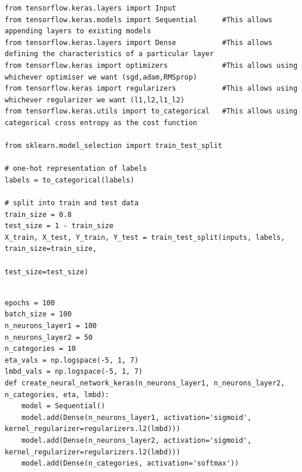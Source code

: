 \documentclass{beamer}
\begin{document}
\begin{frame}
\begin{verbatim}
\end{verbatim}




















\begin{verbatim}
from tensorflow.keras.layers import Input
from tensorflow.keras.models import Sequential      #This allows appending layers to existing models
from tensorflow.keras.layers import Dense           #This allows defining the characteristics of a particular layer
from tensorflow.keras import optimizers             #This allows using whichever optimiser we want (sgd,adam,RMSprop)
from tensorflow.keras import regularizers           #This allows using whichever regularizer we want (l1,l2,l1_l2)
from tensorflow.keras.utils import to_categorical   #This allows using categorical cross entropy as the cost function

from sklearn.model_selection import train_test_split

# one-hot representation of labels
labels = to_categorical(labels)

# split into train and test data
train_size = 0.8
test_size = 1 - train_size
X_train, X_test, Y_train, Y_test = train_test_split(inputs, labels, train_size=train_size,
                                                    test_size=test_size)

\end{verbatim}





















\begin{verbatim}

epochs = 100
batch_size = 100
n_neurons_layer1 = 100
n_neurons_layer2 = 50
n_categories = 10
eta_vals = np.logspace(-5, 1, 7)
lmbd_vals = np.logspace(-5, 1, 7)
def create_neural_network_keras(n_neurons_layer1, n_neurons_layer2, n_categories, eta, lmbd):
    model = Sequential()
    model.add(Dense(n_neurons_layer1, activation='sigmoid', kernel_regularizer=regularizers.l2(lmbd)))
    model.add(Dense(n_neurons_layer2, activation='sigmoid', kernel_regularizer=regularizers.l2(lmbd)))
    model.add(Dense(n_categories, activation='softmax'))
    

\end{verbatim}
\end{frame}
\end{document}
